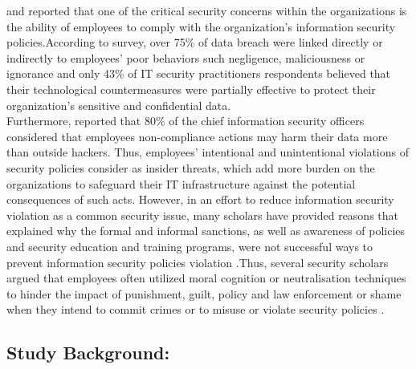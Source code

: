 \cite{Siponen2010} and \cite{Puhakainen2010} reported that one of the critical security concerns within the organizations is the ability of employees to comply with the organization's information security policies.According to \citet{PonemonInstitute2012} survey, over 75\% of data breach were linked directly or indirectly to employees' poor behaviors such negligence, maliciousness or ignorance and only 43\% of IT security practitioners respondents believed that their technological countermeasures were partially effective to protect their organization's sensitive and confidential data. \\
Furthermore,\cite{Barlow2013} reported that 80\% of the chief information security officers considered that employees non-compliance actions may harm their data more than outside hackers. Thus, employees' intentional and unintentional violations of security policies consider as insider threats, which add more burden on the organizations to safeguard their IT infrastructure against the potential consequences of such acts. However, in an effort to reduce information security violation as a common security issue, many scholars have provided reasons that explained why the formal and informal sanctions, as well as awareness of policies and security education and training programs, were not successful ways to prevent information security policies violation   \cite{Siponen2010,Darcy,Chen2012}.Thus, several security scholars argued that employees often utilized moral cognition or neutralisation techniques to hinder the impact of punishment, guilt, policy and law enforcement or shame when they intend to commit crimes or to misuse or violate security policies \cite{Siponen2010,Barlow2013,Teh2015,Sykes1957,Kim2014,Hinduja2007,Ingram2008}.\\

\subsection{Study Background:}

